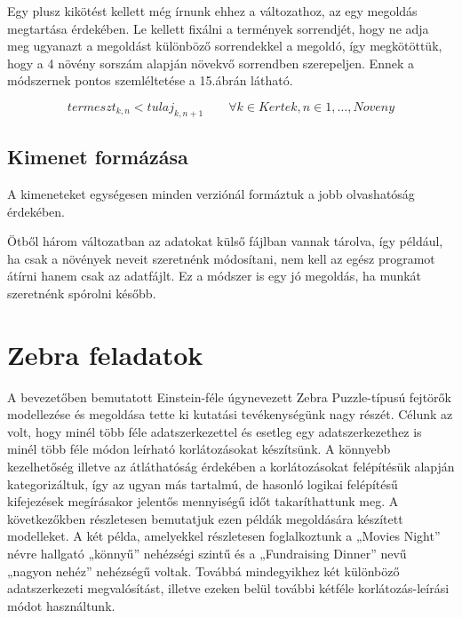 \documentclass[12pt,a4paper,twoside, openright]{report}
\begin{document}

    Egy plusz kikötést kellett még írnunk ehhez a változathoz, az egy megoldás megtartása érdekében.
    Le kellett fixálni a termények sorrendjét, hogy ne adja meg ugyanazt a megoldást különböző sorrendekkel a megoldó, így megkötöttük, hogy a 4 növény sorszám alapján növekvő sorrendben szerepeljen.
    Ennek a módszernek pontos szemléltetése a 15.ábrán látható.

    \begin{equation}
    termeszt_{k,n} < tulaj_{k,n+1} \qquad \forall k \in Kertek, n \in 1,\dots,Noveny
	\end{equation}

\subsection{Kimenet formázása}

    A kimeneteket egységesen minden verziónál formáztuk a jobb olvashatóság érdekében.


    Ötből három változatban az adatokat külső fájlban vannak tárolva, így például, ha csak a növények neveit szeretnénk módosítani, nem kell az egész programot átírni hanem csak az adatfájlt.
    Ez a módszer is egy jó megoldás, ha munkát szeretnénk spórolni később.

\section{Zebra feladatok}

    A bevezetőben bemutatott Einstein-féle úgynevezett Zebra Puzzle-típusú fejtörők\cite{zebra} modellezése és megoldása tette ki kutatási tevékenységünk nagy részét.
    Célunk az volt, hogy minél több féle adatszerkezettel és esetleg egy adatszerkezethez is minél több féle módon leírható korlátozásokat készítsünk.
    A könnyebb kezelhetőség illetve az átláthatóság érdekében a korlátozásokat felépítésük alapján kategorizáltuk, így az ugyan más tartalmú, de hasonló logikai felépítésű kifejezések megírásakor jelentős mennyiségű időt takaríthattunk meg.
    A következőkben részletesen bemutatjuk ezen példák megoldására készített modelleket.
    A két példa, amelyekkel részletesen foglalkoztunk a „Movies Night” névre hallgató „könnyű” nehézségi szintű és a „Fundraising Dinner” nevű „nagyon nehéz” nehézségű voltak.
    Továbbá mindegyikhez két különböző adatszerkezeti megvalósítást, illetve ezeken belül további kétféle korlátozás-leírási módot használtunk.
\end{document}

